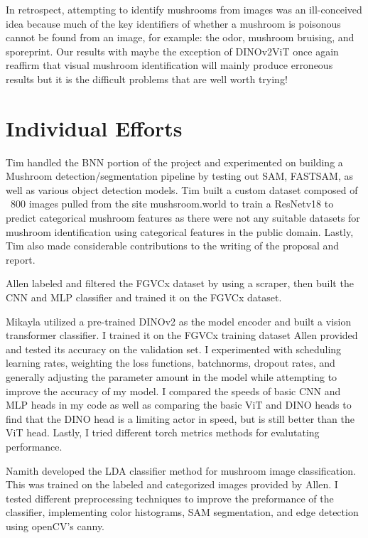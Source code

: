 \documentclass[journal]{IEEEtran}
\begin{document}
In retrospect, attempting to identify mushrooms from images was an ill-conceived idea because much of the key identifiers of whether a mushroom is poisonous cannot be found from an image, for example: the odor, mushroom bruising, and sporeprint. Our results with maybe the exception of DINOv2ViT once again reaffirm that visual mushroom identification will mainly produce erroneous results but it is the difficult problems that are well worth trying!




\section{Individual Efforts}
Tim handled the BNN portion of the project and experimented on building a Mushroom detection/segmentation pipeline by testing out SAM, FASTSAM, as well as various object detection models. Tim built a custom dataset composed of ~800 images pulled from the site mushsroom.world to train a ResNetv18 to predict categorical mushroom features as there were not any suitable datasets for mushroom identification using categorical features in the public domain. Lastly, Tim also made considerable contributions to the writing of the proposal and report.

Allen labeled and filtered the FGVCx dataset by using a scraper, then built the CNN and MLP classifier and trained it on the FGVCx dataset.

Mikayla utilized a pre-trained DINOv2 as the model encoder and built a vision transformer classifier. I trained it on the FGVCx training dataset Allen provided and tested its accuracy on the validation set. I experimented with scheduling learning rates, weighting the loss functions, batchnorms, dropout rates, and generally adjusting the parameter amount in the model while attempting to improve the accuracy of my model. I compared the speeds of basic CNN and MLP heads in my code as well as comparing the basic ViT and DINO heads to find that the DINO head is a limiting actor in speed, but is still better than the ViT head. Lastly, I tried different torch metrics methods for evalutating performance. 

Namith developed the LDA classifier method for mushroom image classification. This was trained on the labeled and categorized images provided by Allen. I tested different preprocessing techniques to improve the preformance of the classifier, implementing color histograms, SAM segmentation, and edge detection using openCV's canny. 
\end{document}
